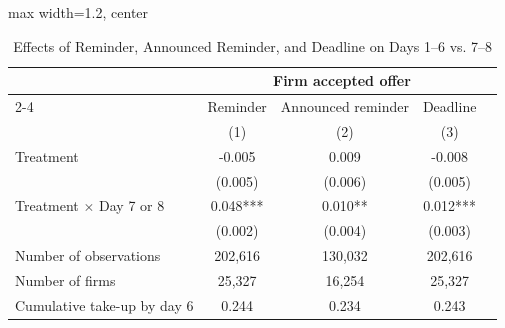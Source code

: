 \begin{table}[H] \centering
\caption{Effects of Reminder, Announced Reminder, and Deadline on Days 1–6 vs. 7–8}
\label{tab:effect_timing_all}
\begin{adjustbox}{max width=1.2\textwidth, center}
\begin{tabular}{lcccc}
\toprule
 & \multicolumn{3}{c}{Firm accepted offer} \\
\cmidrule(lr){2-4}
\multicolumn{1}{r}{Treatment:} & \multicolumn{1}{c}{Reminder} & \multicolumn{1}{c}{Announced reminder} & \multicolumn{1}{c}{Deadline} \\
 & (1) & (2) & (3) \\
\midrule
Treatment & -0.005 & 0.009 & -0.008 \\ & (0.005) & (0.006) & (0.005) \\
Treatment $\times$ Day 7 or 8 & 0.048*** & 0.010** & 0.012*** \\ & (0.002) & (0.004) & (0.003) \\
\midrule
Number of observations & 202,616 & 130,032 & 202,616 \\
Number of firms & 25,327 & 16,254 & 25,327 \\
Cumulative take-up by day 6 & 0.244 & 0.234 & 0.243 \\
\bottomrule
\end{tabular}
\end{adjustbox}
\end{table}
